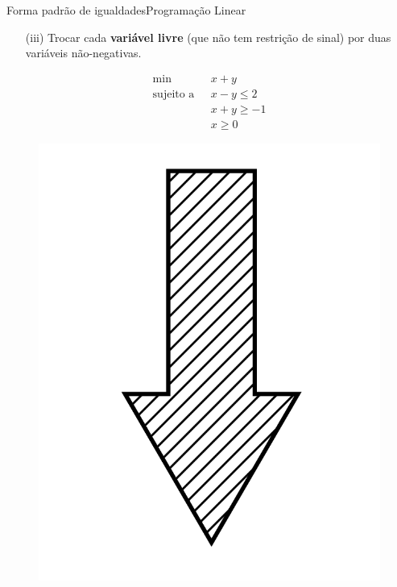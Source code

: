 \documentclass[t]{beamer}
\begin{document}
\begin{ftst}{Forma padrão de igualdades}{Programação Linear}
\begin{itemize}
    \item[(iii)] Trocar cada \textbf{variável livre} (que não tem restrição de sinal) por duas variáveis não-negativas.
\end{itemize}
\vone
\begin{minipage}{0.35\linewidth}
    \begin{align*}
        \text{min} \ \ \ & x + y  \\ 
        \text{sujeito a} \ \ \  & x - y \leq 2 \\
        \text{} \ \ \ & x + y \geq -1 \\
        \text{} \ \ \ & x \geq 0
    \end{align*}
\end{minipage}
\hspace{0.02\linewidth}
\begin{minipage}{0.1\linewidth}
    \begin{figure}
        \centering
        \includegraphics[angle=90, scale=0.05]{Figuras/seta.png}

\end{figure}
\end{minipage}
\end{ftst}
\end{document}
